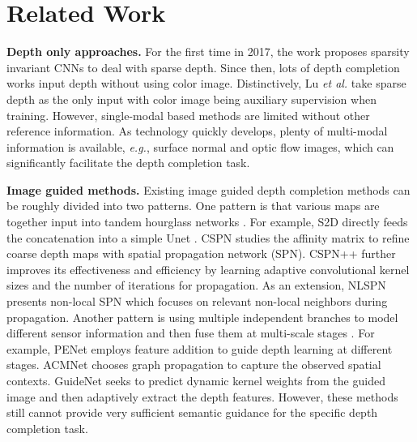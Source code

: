 \documentclass[runningheads]{llncs}
\begin{document}
\section{Related Work}
\textbf{Depth only approaches.} For the first time in 2017, the work \cite{Uhrig2017THREEDV} proposes sparsity invariant CNNs to deal with sparse depth. Since then, lots of depth completion works \cite{Uhrig2017THREEDV,ku2018defense,2018Deep,2018Sparse,2020Confidence,ma2018self,vangansbeke2019} input depth without using color image. Distinctively, Lu \emph{et al.} \cite{2020FromLu} take sparse depth as the only input with color image being auxiliary supervision when training. However, single-modal based methods are limited without other reference information. As technology quickly develops, plenty of multi-modal information is available, \emph{e.g.}, surface normal and optic flow images, which can significantly facilitate the depth completion task.

\noindent \textbf{Image guided methods.} Existing image guided depth completion methods can be roughly divided into two patterns. One pattern is that various maps are together input into tandem hourglass networks \cite{ma2018self,2018Learning,chen2019learning,Cheng2020CSPN,park2020nonlocal,xu2020deformable}. For example, S2D \cite{ma2018self} directly feeds the concatenation into a simple Unet \cite{ronneberger2015u}. CSPN \cite{2018Learning} studies the affinity matrix to refine coarse depth maps with spatial propagation network (SPN). CSPN++ \cite{Cheng2020CSPN} further improves its effectiveness and efficiency by learning adaptive convolutional kernel sizes and the number of iterations for propagation. 
As an extension, NLSPN \cite{park2020nonlocal} presents non-local SPN which focuses on relevant non-local neighbors during propagation. Another pattern is using multiple independent branches to model different sensor information and then fuse them at multi-scale stages \cite{vangansbeke2019,2020Denseyang,tang2020learning,li2020multi,liu2021fcfr,hu2020PENet}. For example, PENet \cite{hu2020PENet} employs feature addition to guide depth learning at different stages. ACMNet \cite{zhao2021adaptive} chooses graph propagation to capture the observed spatial contexts. GuideNet \cite{tang2020learning} seeks to predict dynamic kernel weights from the guided image and then adaptively extract the depth features. However, these methods still cannot provide very sufficient semantic guidance for the specific depth completion task.
\end{document}
